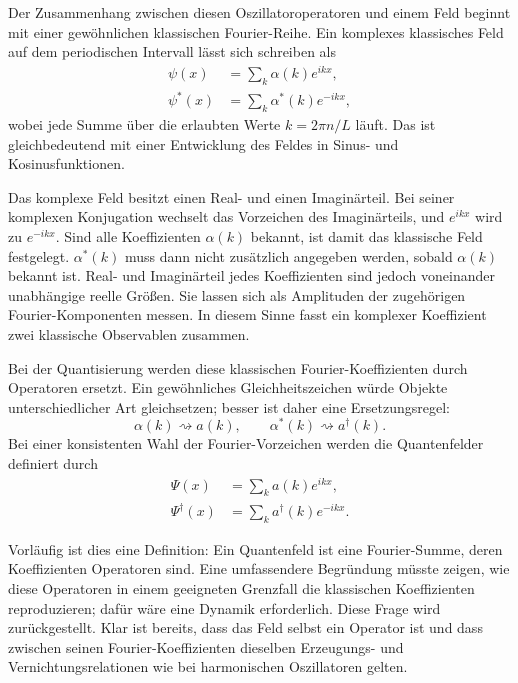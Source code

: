 Der Zusammenhang zwischen diesen Oszillatoroperatoren und einem Feld beginnt mit einer gewöhnlichen klassischen Fourier-Reihe. Ein komplexes klassisches Feld auf dem periodischen Intervall lässt sich schreiben als
\begin{align}
\psi(x)&=\sum_k \alpha(k)e^{ikx},\\
\psi^*(x)&=\sum_k \alpha^*(k)e^{-ikx},
\end{align}
wobei jede Summe über die erlaubten Werte \(k=2\pi n/L\) läuft. Das ist gleichbedeutend mit einer Entwicklung des Feldes in Sinus- und Kosinusfunktionen.

Das komplexe Feld besitzt einen Real- und einen Imaginärteil. Bei seiner komplexen Konjugation wechselt das Vorzeichen des Imaginärteils, und \(e^{ikx}\) wird zu \(e^{-ikx}\). Sind alle Koeffizienten \(\alpha(k)\) bekannt, ist damit das klassische Feld festgelegt. \(\alpha^*(k)\) muss dann nicht zusätzlich angegeben werden, sobald \(\alpha(k)\) bekannt ist. Real- und Imaginärteil jedes Koeffizienten sind jedoch voneinander unabhängige reelle Größen. Sie lassen sich als Amplituden der zugehörigen Fourier-Komponenten messen. In diesem Sinne fasst ein komplexer Koeffizient zwei klassische Observablen zusammen.

Bei der Quantisierung werden diese klassischen Fourier-Koeffizienten durch Operatoren ersetzt. Ein gewöhnliches Gleichheitszeichen würde Objekte unterschiedlicher Art gleichsetzen; besser ist daher eine Ersetzungsregel:
\begin{equation}
\alpha(k)\rightsquigarrow a(k),
\qquad
\alpha^*(k)\rightsquigarrow a^\dagger(k).
\end{equation}
Bei einer konsistenten Wahl der Fourier-Vorzeichen werden die Quantenfelder definiert durch
\begin{align}
\Psi(x)&=\sum_k a(k)e^{ikx},\\
\Psi^\dagger(x)&=\sum_k a^\dagger(k)e^{-ikx}.
\end{align}

Vorläufig ist dies eine Definition: Ein Quantenfeld ist eine Fourier-Summe, deren Koeffizienten Operatoren sind. Eine umfassendere Begründung müsste zeigen, wie diese Operatoren in einem geeigneten Grenzfall die klassischen Koeffizienten reproduzieren; dafür wäre eine Dynamik erforderlich. Diese Frage wird zurückgestellt. Klar ist bereits, dass das Feld selbst ein Operator ist und dass zwischen seinen Fourier-Koeffizienten dieselben Erzeugungs- und Vernichtungsrelationen wie bei harmonischen Oszillatoren gelten.

